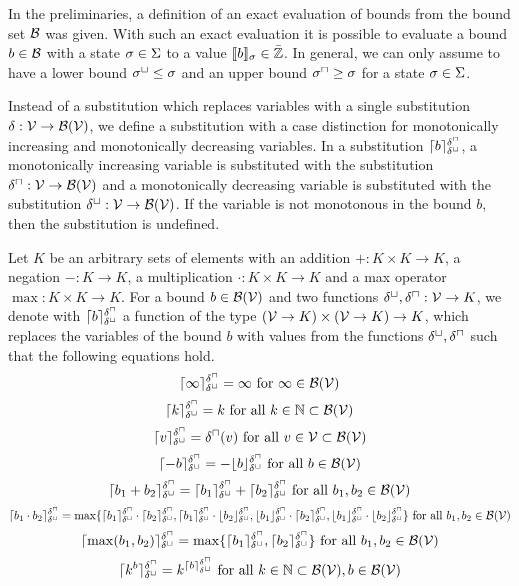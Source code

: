 In the preliminaries, a definition of an exact evaluation of bounds from the bound set $\mathcal{B}$ was given.
With such an exact evaluation it is possible to evaluate a bound $b \in \mathcal{B}$ with a state $\sigma \in \Sigma$ to a value $\llbracket b \rrbracket_{\sigma} \in \bar{\mathbb{Z}}$.
In general, we can only assume to have a lower bound ${\sigma^\sqcup} \leq \sigma$ and an upper bound ${\sigma^\sqcap} \geq \sigma$ for a state $\sigma \in \Sigma$.


Instead of a substitution which replaces variables with a single substitution $\delta: \mathcal{V} \rightarrow \mathcal{B}(\mathcal{V})$, we define a substitution with a case distinction for monotonically increasing and monotonically decreasing variables.
In a substitution $\lceil b \rceil^{\delta^\sqcap}_{\delta^\sqcup}$, a monotonically increasing variable is substituted with the substitution $\delta^\sqcap: \mathcal{V} \rightarrow \mathcal{B}(\mathcal{V})$ and a monotonically decreasing variable is substituted with the substitution $\delta^\sqcup: \mathcal{V} \rightarrow \mathcal{B}(\mathcal{V})$.
If the variable is not monotonous in the bound $b$, then the substitution is undefined.
\begin{definition}
  Let $K$ be an arbitrary sets of elements with an addition $+: K \times K \rightarrow K$, a negation $-: K \rightarrow K$, a multiplication $\cdot: K \times K \rightarrow K$ and a max operator $\max: K \times K \rightarrow K$.
  For a bound $b \in \mathcal{B}(\mathcal{V})$ and two functions $\delta^\sqcup, \delta^\sqcap: \mathcal{V} \rightarrow K$, we denote with $\lceil b \rceil^{\delta^\sqcap}_{\delta^\sqcup}$ a function of the type $(\mathcal{V} \rightarrow K) \times (\mathcal{V} \rightarrow K) \rightarrow K$, which replaces the variables of the bound $b$ with values from the functions $\delta^\sqcup, \delta^\sqcap$ such that the following equations hold.
  \[ \lceil \infty \rceil^{\delta^\sqcap}_{\delta^\sqcup} = \infty \text{ for } \infty \in \mathcal{B}(\mathcal{V}) \]
  \[ \lceil k \rceil^{\delta^\sqcap}_{\delta^\sqcup} = k \text{ for all } k \in \mathbb{N} \subset \mathcal{B}(\mathcal{V}) \] 
  \[ \lceil v \rceil^{\delta^\sqcap}_{\delta^\sqcup} = \delta^\sqcap(v) \text{ for all } v \in \mathcal{V} \subset \mathcal{B}(\mathcal{V}) \] 
  \[ \lceil -b \rceil^{\delta^\sqcap}_{\delta^\sqcup} = -\lfloor b \rfloor^{\delta^\sqcap}_{\delta^\sqcup} \text{ for all } b \in \mathcal{B}(\mathcal{V}) \] 
  \[ \lceil b_1 + b_2 \rceil^{\delta^\sqcap}_{\delta^\sqcup} = \lceil b_1 \rceil^{\delta^\sqcap}_{\delta^\sqcup} + \lceil b_2 \rceil^{\delta^\sqcap}_{\delta^\sqcup} \text{ for all } b_1, b_2 \in \mathcal{B}(\mathcal{V}) \] 
  \[ \lceil b_1 \cdot b_2 \rceil^{\delta^\sqcap}_{\delta^\sqcup} = \max \lbrace 
    \lceil b_1 \rceil^{\delta^\sqcap}_{\delta^\sqcup} \cdot \lceil b_2 \rceil^{\delta^\sqcap}_{\delta^\sqcup},
    \lceil b_1 \rceil^{\delta^\sqcap}_{\delta^\sqcup} \cdot \lfloor b_2 \rfloor^{\delta^\sqcap}_{\delta^\sqcup},
    \lfloor b_1 \rfloor^{\delta^\sqcap}_{\delta^\sqcup} \cdot \lceil b_2 \rceil^{\delta^\sqcap}_{\delta^\sqcup},
    \lfloor b_1 \rfloor^{\delta^\sqcap}_{\delta^\sqcup} \cdot \lfloor b_2 \rfloor^{\delta^\sqcap}_{\delta^\sqcup}
   \rbrace \text{ for all } b_1, b_2 \in \mathcal{B}(\mathcal{V}) \] 
  \[ \lceil \max(b_1, b_2) \rceil^{\delta^\sqcap}_{\delta^\sqcup} = \max \lbrace \lceil b_1 \rceil^{\delta^\sqcap}_{\delta^\sqcup}, \lceil b_2 \rceil^{\delta^\sqcap}_{\delta^\sqcup} \rbrace \text{ for all } b_1, b_2 \in \mathcal{B}(\mathcal{V}) \]
  \[ \lceil k^b \rceil^{\delta^\sqcap}_{\delta^\sqcup} = k^{\lceil b \rceil^{\delta^\sqcap}_{\delta^\sqcup}} \text{ for all } k \in \mathbb{N} \subset \mathcal{B}(\mathcal{V}), b \in \mathcal{B}(\mathcal{V}) \]  
\end{definition}

